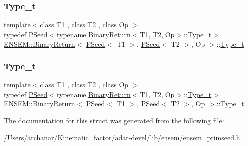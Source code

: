 \subsubsection{\texorpdfstring{Type\_t}{Type\_t}\hspace{0.1cm}{\footnotesize\ttfamily [2/3]}}
{\footnotesize\ttfamily template$<$class T1 , class T2 , class Op $>$ \\
typedef \mbox{\hyperlink{classENSEM_1_1PSeed}{P\+Seed}}$<$typename \mbox{\hyperlink{structENSEM_1_1BinaryReturn}{Binary\+Return}}$<$T1, T2, Op$>$\+::\mbox{\hyperlink{structENSEM_1_1BinaryReturn_3_01PSeed_3_01T1_01_4_00_01PSeed_3_01T2_01_4_00_01Op_01_4_ae3a30c4b21f95d0ccf2ef57c02e76dcb}{Type\+\_\+t}}$>$ \mbox{\hyperlink{structENSEM_1_1BinaryReturn}{E\+N\+S\+E\+M\+::\+Binary\+Return}}$<$ \mbox{\hyperlink{classENSEM_1_1PSeed}{P\+Seed}}$<$ T1 $>$, \mbox{\hyperlink{classENSEM_1_1PSeed}{P\+Seed}}$<$ T2 $>$, Op $>$\+::\mbox{\hyperlink{structENSEM_1_1BinaryReturn_3_01PSeed_3_01T1_01_4_00_01PSeed_3_01T2_01_4_00_01Op_01_4_ae3a30c4b21f95d0ccf2ef57c02e76dcb}{Type\+\_\+t}}}

\mbox{\label{structENSEM_1_1BinaryReturn_3_01PSeed_3_01T1_01_4_00_01PSeed_3_01T2_01_4_00_01Op_01_4_ae3a30c4b21f95d0ccf2ef57c02e76dcb}} 
\subsubsection{\texorpdfstring{Type\_t}{Type\_t}\hspace{0.1cm}{\footnotesize\ttfamily [3/3]}}
{\footnotesize\ttfamily template$<$class T1 , class T2 , class Op $>$ \\
typedef \mbox{\hyperlink{classENSEM_1_1PSeed}{P\+Seed}}$<$typename \mbox{\hyperlink{structENSEM_1_1BinaryReturn}{Binary\+Return}}$<$T1, T2, Op$>$\+::\mbox{\hyperlink{structENSEM_1_1BinaryReturn_3_01PSeed_3_01T1_01_4_00_01PSeed_3_01T2_01_4_00_01Op_01_4_ae3a30c4b21f95d0ccf2ef57c02e76dcb}{Type\+\_\+t}}$>$ \mbox{\hyperlink{structENSEM_1_1BinaryReturn}{E\+N\+S\+E\+M\+::\+Binary\+Return}}$<$ \mbox{\hyperlink{classENSEM_1_1PSeed}{P\+Seed}}$<$ T1 $>$, \mbox{\hyperlink{classENSEM_1_1PSeed}{P\+Seed}}$<$ T2 $>$, Op $>$\+::\mbox{\hyperlink{structENSEM_1_1BinaryReturn_3_01PSeed_3_01T1_01_4_00_01PSeed_3_01T2_01_4_00_01Op_01_4_ae3a30c4b21f95d0ccf2ef57c02e76dcb}{Type\+\_\+t}}}



The documentation for this struct was generated from the following file\+:\begin{DoxyCompactItemize}
\item 
/\+Users/archanar/\+Kinematic\+\_\+factor/adat-\/devel/lib/ensem/\mbox{\hyperlink{adat-devel_2lib_2ensem_2ensem__primseed_8h}{ensem\+\_\+primseed.\+h}}\end{DoxyCompactItemize}
